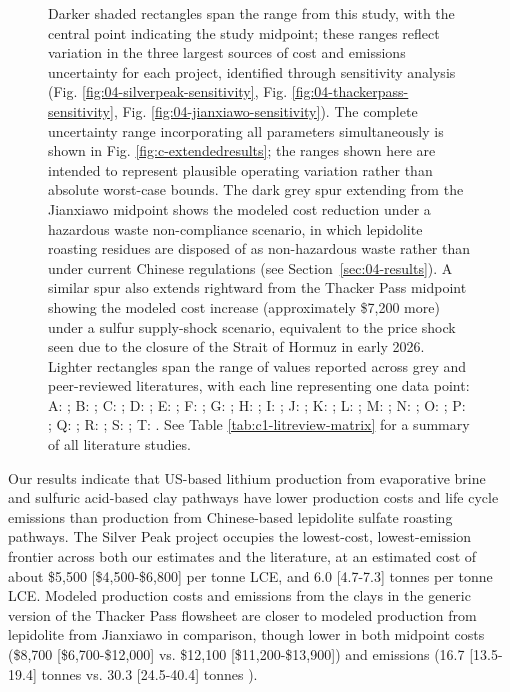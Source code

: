 \documentclass{article}
\renewcommand\_{\textunderscore\allowbreak}
\begin{document}
\begin{figure}[!h]
    \small{Darker shaded rectangles span the range from this study, with the central point indicating the study midpoint; these ranges reflect variation in the three largest sources of cost and emissions uncertainty for each project, identified through sensitivity analysis (Fig. \ref{fig:04-silverpeak-sensitivity}, Fig. \ref{fig:04-thackerpass-sensitivity}, Fig. \ref{fig:04-jianxiawo-sensitivity}). The complete uncertainty range incorporating all parameters simultaneously is shown in Fig. \ref{fig:c-extendedresults}; the ranges shown here are intended to represent plausible operating variation rather than absolute worst-case bounds. The dark grey spur extending from the Jianxiawo midpoint shows the modeled cost reduction under a hazardous waste non-compliance scenario, in which lepidolite roasting residues are disposed of as non-hazardous waste rather than under current Chinese regulations (see Section~\ref{sec:04-results}). A similar spur also extends rightward from the Thacker Pass midpoint showing the modeled cost increase (approximately \$7,200 more) under a sulfur supply-shock scenario, equivalent to the price shock seen due to the closure of the Strait of Hormuz in early 2026. Lighter rectangles span the range of values reported across grey and peer-reviewed literatures, with each line representing one data point: A: \citet{srkconsultingSECTechnicalReport2023a}; B: \citet{sgscanadaincSK1300Technical2024}; C: \citet{ambroseUnderstandingFutureLithium2020a}; D: \citet{mousavinezhadNextLithiumBoom2025}; E: \citet{flemingLongrunAvailabilityMineral2024}; F: \citet{wesselkaemperOptimizationProcessingCosts2025}; G: \citet{tianIntegratedEnvironmentalEconomic2026}; H: \citet{chenLithiumSpotPrice2023}; I: \citet{atkinsonLithiumPriceReversion2023}; J: \citet{liuChinaLithiumBoom2024}; K: \citet{liLithiumWeaknessPushes2024}; L: \citet{sunRobustAssessmentsLithium2025}; M: \citet{manjongLifeCycleModelling2021}; N: \citet{ambroseUnderstandingFutureLithium2020b}; O: \citet{schenkerCurrentFutureImpacts2025}; P: \citet{khakmardanLifeCycleAssessment2024}; Q: \citet{iyerLifecycleAnalysisLithium2024}; R: \citet{royLithiumClayAssessing2024}; S: \citet{wangLifeCycleEnvironmental2026};  T: \citet{liuCarbonFootprintBatteryGrade2025}. See Table \ref{tab:c1-litreview-matrix} for a summary of all literature studies.}
    \label{fig:04-costemissions}
\end{figure}

Our results indicate that US-based lithium production from evaporative brine and sulfuric acid-based clay pathways have lower production costs and life cycle emissions than production from Chinese-based lepidolite sulfate roasting pathways. The Silver Peak project occupies the lowest-cost, lowest-emission frontier across both our estimates and the literature, at an estimated cost of about \$5,500 [\$4,500-\$6,800] per tonne LCE, and 6.0 [4.7-7.3] tonnes  per tonne LCE. Modeled production costs and emissions from the clays in the generic version of the Thacker Pass flowsheet are closer to modeled production from lepidolite from Jianxiawo in comparison, though lower in both midpoint costs (\$8,700 [\$6,700-\$12,000] vs. \$12,100 [\$11,200-\$13,900]) and emissions (16.7 [13.5-19.4] tonnes  vs. 30.3 [24.5-40.4] tonnes ). 
\end{document}
